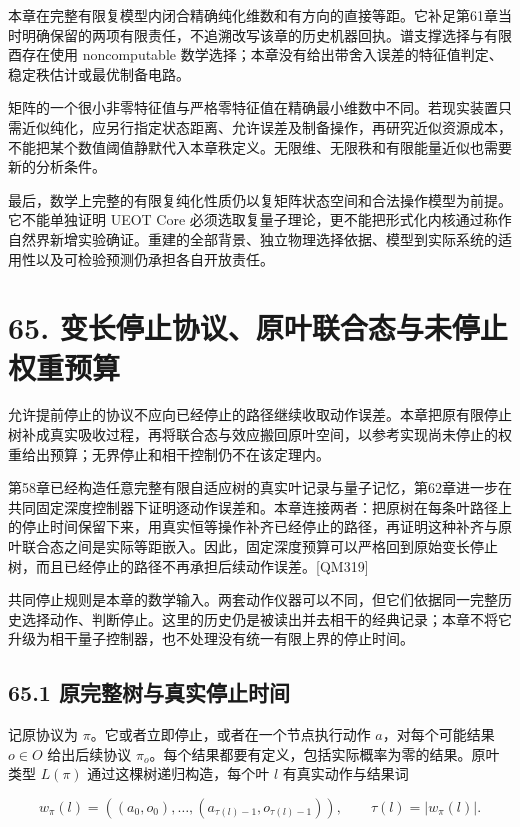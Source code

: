 \documentclass[
  11pt,
  oneside]{book}
\begin{document}
本章在完整有限复模型内闭合精确纯化维数和有方向的直接等距。它补足第61章当时明确保留的两项有限责任，不追溯改写该章的历史机器回执。谱支撑选择与有限酉存在使用
noncomputable
数学选择；本章没有给出带舍入误差的特征值判定、稳定秩估计或最优制备电路。

矩阵的一个很小非零特征值与严格零特征值在精确最小维数中不同。若现实装置只需近似纯化，应另行指定状态距离、允许误差及制备操作，再研究近似资源成本，不能把某个数值阈值静默代入本章秩定义。无限维、无限秩和有限能量近似也需要新的分析条件。

最后，数学上完整的有限复纯化性质仍以复矩阵状态空间和合法操作模型为前提。它不能单独证明
UEOT Core
必须选取复量子理论，更不能把形式化内核通过称作自然界新增实验确证。重建的全部背景、独立物理选择依据、模型到实际系统的适用性以及可检验预测仍承担各自开放责任。

\chapter{65. 变长停止协议、原叶联合态与未停止权重预算}\label{ch-65}\hypertarget{ch-65}{}

允许提前停止的协议不应向已经停止的路径继续收取动作误差。本章把原有限停止树补成真实吸收过程，再将联合态与效应搬回原叶空间，以参考实现尚未停止的权重给出预算；无界停止和相干控制仍不在该定理内。

第58章已经构造任意完整有限自适应树的真实叶记录与量子记忆，第62章进一步在共同固定深度控制器下证明逐动作误差和。本章连接两者：把原树在每条叶路径上的停止时间保留下来，用真实恒等操作补齐已经停止的路径，再证明这种补齐与原叶联合态之间是实际等距嵌入。因此，固定深度预算可以严格回到原始变长停止树，而且已经停止的路径不再承担后续动作误差。{[}QM319{]}

共同停止规则是本章的数学输入。两套动作仪器可以不同，但它们依据同一完整历史选择动作、判断停止。这里的历史仍是被读出并去相干的经典记录；本章不将它升级为相干量子控制器，也不处理没有统一有限上界的停止时间。

\section{65.1 原完整树与真实停止时间}

记原协议为 \(\pi\)。它或者立即停止，或者在一个节点执行动作
\(a\)，对每个可能结果 \(o\in O\) 给出后续协议
\(\pi_o\)。每个结果都要有定义，包括实际概率为零的结果。原叶类型
\(L(\pi)\) 通过这棵树递归构造，每个叶 \(l\) 有真实动作与结果词

\[
w_\pi(l)=((a_0,o_0),\ldots,(a_{\tau(l)-1},o_{\tau(l)-1})),
\qquad \tau(l)=|w_\pi(l)|.
\]
\end{document}

